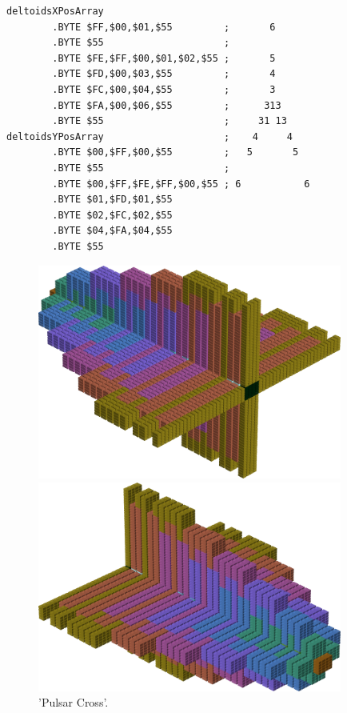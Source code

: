 \begin{minipage}[b]{0.48\linewidth}
\begin{lrbox}{\mybox}%
\begin{lstlisting}[basicstyle=\ttfamily\tiny,escapechar=\%]
deltoidsXPosArray                     
        .BYTE $FF,$00,$01,$55         ;       6      
        .BYTE $55                     ;              
        .BYTE $FE,$FF,$00,$01,$02,$55 ;       5      
        .BYTE $FD,$00,$03,$55         ;       4      
        .BYTE $FC,$00,$04,$55         ;       3      
        .BYTE $FA,$00,$06,$55         ;      313     
        .BYTE $55                     ;     31 13    
deltoidsYPosArray                     ;    4     4   
        .BYTE $00,$FF,$00,$55         ;   5       5  
        .BYTE $55                     ;              
        .BYTE $00,$FF,$FE,$FF,$00,$55 ; 6           6
        .BYTE $01,$FD,$01,$55
        .BYTE $02,$FC,$02,$55
        .BYTE $04,$FA,$04,$55
        .BYTE $55
\end{lstlisting}
\end{lrbox}%
\scalebox{0.8}{\usebox{\mybox}}

\end{minipage}
%
%
\begin{minipage}[b]{0.48\linewidth}
\begin{figure}[H]
    \centering
    \begin{adjustbox}{width=6cm,margin=0cm 0cm}
      \includegraphics[width=10cm]{src/colorspace_patterns/pattern4-45.png}%
    \end{adjustbox}
    \begin{adjustbox}{width=6cm,margin=0cm 0cm}
      \includegraphics[width=10cm]{src/colorspace_patterns/pattern4-225.png}%
    \end{adjustbox}
\caption{'Pulsar Cross'.}
\end{figure}
\end{minipage}
